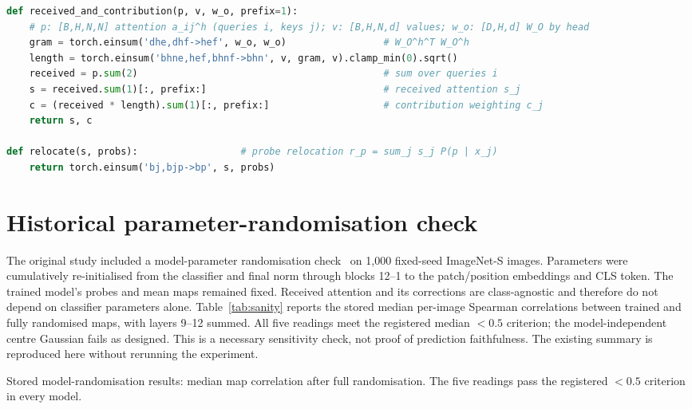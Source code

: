 \begin{lstlisting}[language=Python]
def received_and_contribution(p, v, w_o, prefix=1):
    # p: [B,H,N,N] attention a_ij^h (queries i, keys j); v: [B,H,N,d] values; w_o: [D,H,d] W_O by head
    gram = torch.einsum('dhe,dhf->hef', w_o, w_o)                 # W_O^h^T W_O^h
    length = torch.einsum('bhne,hef,bhnf->bhn', v, gram, v).clamp_min(0).sqrt()
    received = p.sum(2)                                           # sum over queries i
    s = received.sum(1)[:, prefix:]                               # received attention s_j
    c = (received * length).sum(1)[:, prefix:]                    # contribution weighting c_j
    return s, c

def relocate(s, probs):                  # probe relocation r_p = sum_j s_j P(p | x_j)
    return torch.einsum('bj,bjp->bp', s, probs)
\end{lstlisting}

\section{Historical parameter-randomisation check}
\label{app:sanity}

The original study included a model-parameter randomisation check~\citep{adebayo2018} on 1,000 fixed-seed ImageNet-S images. Parameters were cumulatively re-initialised from the classifier and final norm through blocks 12--1 to the patch/position embeddings and CLS token. The trained model's probes and mean maps remained fixed. Received attention and its corrections are class-agnostic and therefore do not depend on classifier parameters alone. Table~\ref{tab:sanity} reports the stored median per-image Spearman correlations between trained and fully randomised maps, with layers 9--12 summed. All five readings meet the registered median $<0.5$ criterion; the model-independent centre Gaussian fails as designed. This is a necessary sensitivity check, not proof of prediction faithfulness. The existing summary is reproduced here without rerunning the experiment.

\begin{table}[!htbp]
\caption{Stored model-randomisation results: median map correlation after full randomisation. The five readings pass the registered $<0.5$ criterion in every model.}
\label{tab:sanity}
\centering\small

\end{table}

